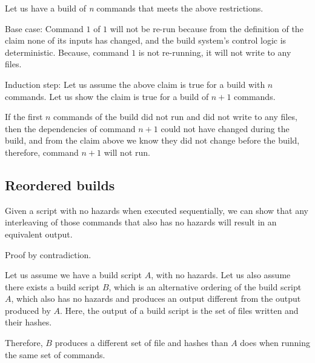 Let us have a build of \emph{n} commands that meets the above restrictions.

Base case: Command $1$ of $1$  will not be re-run because from the definition of the claim none of its inputs has changed, and the build system's control logic is deterministic.  Because, command $1$ is not re-running, it will not write to any files.

Induction step:  Let us assume the above claim is true for a build with $n$ commands.  Let us show the claim is true for a build of $n+1$ commands.

If the first $n$ commands of the build did not run and did not write to any files, then the dependencies of command $n+1$ could not have changed during the build, and from the claim above we know they did not change before the build, therefore, command $n+1$ will not run.

\subsection{Reordered builds}
\label{sec:proof:reorder}

Given a script with no hazards when executed sequentially, we can show that any interleaving of those commands that also has no hazards will result in an equivalent output.

Proof by contradiction.

Let us assume we have a build script $A$, with no hazards.  Let us also assume there exists a build script $B$, which is an alternative ordering of the build script $A$, which also has no hazards and produces an output different from the output produced by $A$.  Here, the output of a build script is the set of files written and their hashes.

Therefore, $B$ produces a different set of file and hashes than $A$ does when running the same set of commands.

